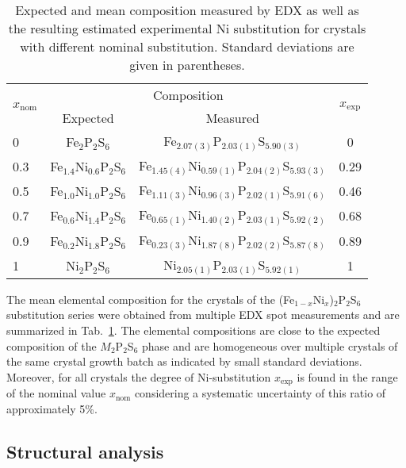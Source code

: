 \documentclass[twocolumn,superscriptaddress,prb,preprintnumbers,nobibnotes,aps]{revtex4-2}  %
\begin{document}
\begin{table}[htb]
\begin{tabular}{lccc}
\hline \hline
\multirow{2}{*}{$x_\textrm{nom}$} & \multicolumn{2}{c}{Composition} & \multirow{2}{*}{$x_\textrm{exp}$} \\
 & Expected & Measured &  \\
\hline
0   & Fe$_{2}$P$_{2}$S$_{6}$          & Fe$_{2.07(3)}$P$_{2.03(1)}$S$_{5.90(3)}$              & 0    \\
0.3 & Fe$_{1.4}$Ni$_{0.6}$P$_{2}$S$_{6}$  & Fe$_{1.45(4)}$Ni$_{0.59(1)}$P$_{2.04(2)}$S$_{5.93(3)}$ & 0.29 \\
0.5 & Fe$_{1.0}$Ni$_{1.0}$P$_{2}$S$_{6}$ & Fe$_{1.11(3)}$Ni$_{0.96(3)}$P$_{2.02(1)}$S$_{5.91(6)}$ & 0.46 \\
0.7 & Fe$_{0.6}$Ni$_{1.4}$P$_{2}$S$_{6}$  & Fe$_{0.65(1)}$Ni$_{1.40(2)}$P$_{2.03(1)}$S$_{5.92(2)}$ & 0.68 \\
0.9 & Fe$_{0.2}$Ni$_{1.8}$P$_{2}$S$_{6}$  & Fe$_{0.23(3)}$Ni$_{1.87(8)}$P$_{2.02(2)}$S$_{5.87(8)}$ & 0.89 \\
1   & Ni$_{2}$P$_{2}$S$_{6}$          & Ni$_{2.05(1)}$P$_{2.03(1)}$S$_{5.92(1)}$              & 1    \\
\hline \hline
\end{tabular}
\caption{Expected and mean composition measured by EDX as well as the resulting estimated experimental Ni substitution for crystals with different nominal substitution. Standard deviations are given in parentheses.}
\label{tab:elemental_composition}
\end{table}

The mean elemental composition for the crystals of the (Fe$_{1-x}$Ni$_{x}$)$_2$P$_2$S$_6$ substitution series were obtained from multiple EDX spot measurements and are summarized in Tab.~\ref{tab:elemental_composition}. The elemental compositions are close to the expected composition of the $M_2$P$_2$S$_6$ phase and are homogeneous over multiple crystals of the same crystal growth batch as indicated by small standard deviations. Moreover, for all crystals the degree of Ni-substitution $x_\textrm{exp}$ is found in the range of the nominal value $x_\textrm{nom}$ considering a systematic uncertainty of this ratio of approximately 5\%.


\subsection{Structural analysis}
\end{document}
